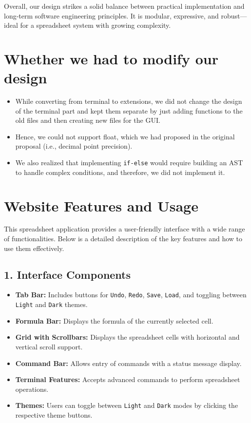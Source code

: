 \documentclass{article}
\begin{document}
Overall, our design strikes a solid balance between practical implementation and long-term software engineering principles. It is modular, expressive, and robust—ideal for a spreadsheet system with growing complexity.

\section*{Whether we had to modify our design}
\begin{itemize}
    \item While converting from terminal to extensions, we did not change the design of the terminal part and kept them separate by just adding functions to the old files and then creating new files for the GUI.
    \item Hence, we could not support float, which we had proposed in the original proposal (i.e., decimal point precision).
    \item We also realized that implementing \texttt{if-else} would require building an AST to handle complex conditions, and therefore, we did not implement it.
\end{itemize}

\section*{Website Features and Usage}

This spreadsheet application provides a user-friendly interface with a wide range of functionalities. Below is a detailed description of the key features and how to use them effectively.

\subsection*{1. Interface Components}
\begin{itemize}
    \item \textbf{Tab Bar:} Includes buttons for \texttt{Undo}, \texttt{Redo}, \texttt{Save}, \texttt{Load}, and toggling between \texttt{Light} and \texttt{Dark} themes.
    \item \textbf{Formula Bar:} Displays the formula of the currently selected cell.
    \item \textbf{Grid with Scrollbars:} Displays the spreadsheet cells with horizontal and vertical scroll support.
    \item \textbf{Command Bar:} Allows entry of commands with a status message display.
    \item \textbf{Terminal Features:} Accepts advanced commands to perform spreadsheet operations.
    \item \textbf{Themes:} Users can toggle between \texttt{Light} and \texttt{Dark} modes by clicking the respective theme buttons.
\end{itemize}
\end{document}
